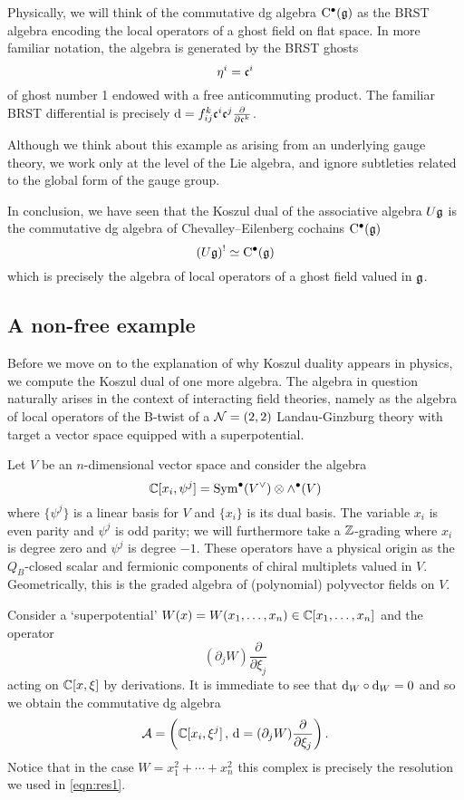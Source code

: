 \documentclass[11pt]{amsart}
\def\brian#1{{\textcolor{blue!65!red}{BRW: {#1}}}}
\def\natalie#1{{\textcolor{green!65!black}{NMP: {#1}}}}
\begin{document}
Physically, we will think of the commutative dg algebra ${\rm C}^\bullet(\mathfrak g)$ as the BRST algebra encoding the local operators of a ghost field on flat space. 
In more familiar notation, the algebra is generated by the BRST ghosts 
\[
\eta^i = \mathfrak c^{i}
\]
of ghost number 1 endowed with a free anticommuting product.
The familiar BRST differential is precisely ${\rm d} = f_{ij}^k \mathfrak c^i \mathfrak c^j \frac{\partial}{\partial \mathfrak c^k}$.

Although we think about this example as arising from an underlying gauge theory, we work only at the level of the Lie algebra, and ignore subtleties related to the global form of the gauge group. 

In conclusion, we have seen that the Koszul dual of the associative algebra $U \mathfrak g$ is the commutative dg algebra of Chevalley--Eilenberg cochains ${\rm C}^\bullet(\mathfrak g)$
\[
(U \mathfrak g)^! \simeq {\rm C}^\bullet (\mathfrak g) 
\]
which is precisely the algebra of local operators of a ghost field valued in $\mathfrak g$. 

\subsection{A non-free example} 
\label{sec:LG1}

Before we move on to the explanation of why Koszul duality appears in physics, we compute the Koszul dual of one more algebra. The algebra in question naturally arises in the context of interacting field theories, namely as the algebra of local operators of the B-twist of a $\mathcal N = (2,2)$ Landau-Ginzburg theory with target a vector space equipped with a superpotential.

Let $V$ be an $n$-dimensional vector space and consider the algebra 
\[
\mathbb C[x_i, \psi^j] = \operatorname{Sym}^\bullet (V^\vee) \otimes \wedge^\bullet(V) 
\]
where $\{\psi^j\}$ is a linear basis for $V$ and $\{x_i\}$ is its dual basis.
The variable $x_i$ is even parity and $\psi^j$ is odd parity; we will furthermore take a $\mathbb Z$-grading where $x_i$ is degree zero and $\psi^j$ is degree $-1$. These operators have a physical origin as the $Q_B$-closed scalar and fermionic components of chiral multiplets valued in $V$.
Geometrically, this is the graded algebra of (polynomial) polyvector fields on $V$.

Consider a `superpotential' $W(x) = W(x_1,\ldots, x_n) \in \mathbb C[x_1,\ldots, x_n]$ and the operator 
\[
(\partial_j W) \frac{\partial}{\partial \xi_j}
\]
acting on $\mathbb C[x,\xi]$ by derivations. 
It is immediate to see that ${\rm d}_W \circ {\rm d}_W = 0$ and so we obtain the commutative dg algebra 
\[
\mathcal A = \left(\mathbb C[x_i, \xi^j] \, , \, {\rm d} = (\partial_j W) \frac{\partial}{\partial \xi_j} \right).
\]
Notice that in the case $W = x_1^2 + \cdots + x_n^2$ this complex is precisely the resolution we used in \eqref{eqn:res1}. 
\end{document}
